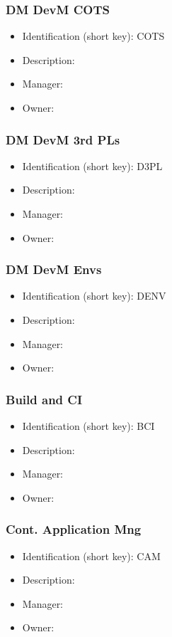 \subsubsection{DM DevM COTS}\label{sect:COTS}
\begin{itemize}
\item Identification (short key): COTS
\item Description: 
\item Manager: 
\item Owner: 
\end{itemize}

\subsubsection{DM DevM 3rd PLs}\label{sect:D3PL}
\begin{itemize}
\item Identification (short key): D3PL
\item Description: 
\item Manager: 
\item Owner: 
\end{itemize}

\subsubsection{DM DevM Envs}\label{sect:DENV}
\begin{itemize}
\item Identification (short key): DENV
\item Description: 
\item Manager: 
\item Owner: 
\end{itemize}

\subsubsection{Build and CI}\label{sect:BCI}
\begin{itemize}
\item Identification (short key): BCI
\item Description: 
\item Manager: 
\item Owner: 
\end{itemize}

\subsubsection{Cont. Application Mng}\label{sect:CAM}
\begin{itemize}
\item Identification (short key): CAM
\item Description: 
\item Manager: 
\item Owner: 
\end{itemize}


